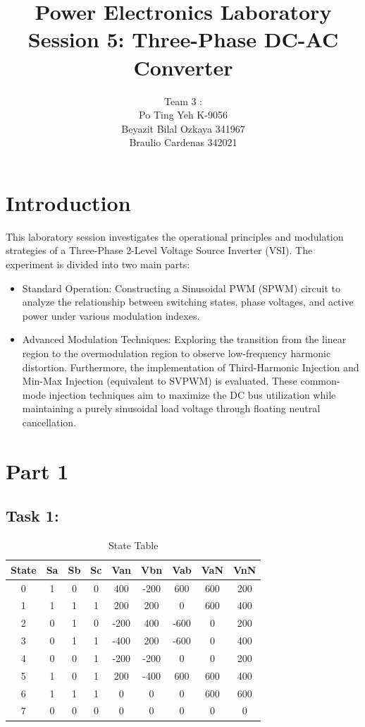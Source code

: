 \documentclass{article}
\title{\textbf{Power Electronics Laboratory 
\\Session 5: Three-Phase DC-AC Converter}}
\author{Team 3 :
 \\Po Ting Yeh K-9056
\\Beyazit Bilal Ozkaya 341967
 \\Braulio Cardenas 342021}
\date{}
\begin{document}
\maketitle

\section*{Introduction}
This laboratory session investigates the operational principles and modulation strategies of a Three-Phase 2-Level Voltage Source Inverter (VSI). The experiment is divided into two main parts:
\begin{itemize}
    \item Standard Operation: Constructing a Sinusoidal PWM (SPWM) circuit to analyze the relationship between switching states, phase voltages, and active power under various modulation indexes.
\end{itemize}
\begin{itemize}
    \item Advanced Modulation Techniques: Exploring the transition from the linear region to the overmodulation region to observe low-frequency harmonic distortion. Furthermore, the implementation of Third-Harmonic Injection and Min-Max Injection (equivalent to SVPWM) is evaluated. These common-mode injection techniques aim to maximize the DC bus utilization while maintaining a purely sinusoidal load voltage through floating neutral cancellation.
\end{itemize}
\section{Part 1}
\subsection{Task 1:}

\begin{table}[H]
\centering
\begin{tabular}{|c|c|c|c|c|c|c|c|c|}
\hline
State & Sa & Sb & Sc & Van & Vbn & Vab & VaN & VnN \\
\hline
0 & 1 & 0 & 0 & 400  & -200 & 600  & 600 & 200 \\
\hline
1 & 1 & 1 & 1 & 200  & 200  & 0    & 600 & 400 \\
\hline
2 & 0 & 1 & 0 & -200 & 400  & -600 & 0   & 200 \\
\hline
3 & 0 & 1 & 1 & -400 & 200  & -600 & 0   & 400 \\
\hline
4 & 0 & 0 & 1 & -200 & -200 & 0    & 0   & 200 \\
\hline
5 & 1 & 0 & 1 & 200  & -400 & 600  & 600 & 400 \\
\hline
6 & 1 & 1 & 1 & 0    & 0    & 0    & 600 & 600 \\
\hline
7 & 0 & 0 & 0 & 0    & 0    & 0    & 0   & 0 \\
\hline
\end{tabular}
\caption{State Table}
\end{table}
\end{document}
